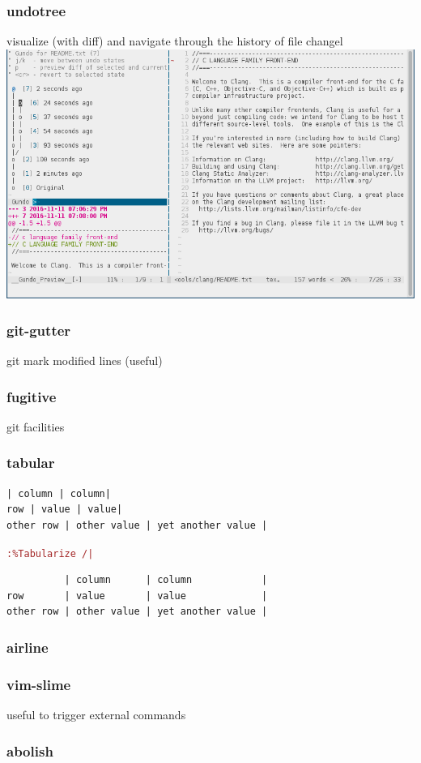\documentclass{beamer}
\newcommand{\vimcommand}[1]{\texttt{\textcolor{brown}{#1}}}
\begin{document}
\begin{frame}
  \frametitle{undotree}
  visualize (with diff) and navigate through the history of file changel
 \includegraphics[scale=0.33]{vim_undotree_example.png}\\
\end{frame}

\begin{frame}
  \frametitle{git-gutter}
  git mark modified lines (useful)
\end{frame}

\begin{frame}
  \frametitle{fugitive}
  git facilities
\end{frame}

\begin{frame}[fragile]
  \frametitle{tabular}
{\footnotesize
\begin{verbatim}
| column | column|
row | value | value|
other row | other value | yet another value |
\end{verbatim}
}
\vimcommand{:\%Tabularize /|}
{\footnotesize
\begin{verbatim}
          | column      | column            |
row       | value       | value             |
other row | other value | yet another value |
\end{verbatim}
}
\end{frame}

\begin{frame}
  \frametitle{airline}
\end{frame}

\begin{frame}
  \frametitle{vim-slime}
  useful to trigger external commands
\end{frame}


\begin{frame}
  \frametitle{abolish}
\end{frame}
\end{document}
